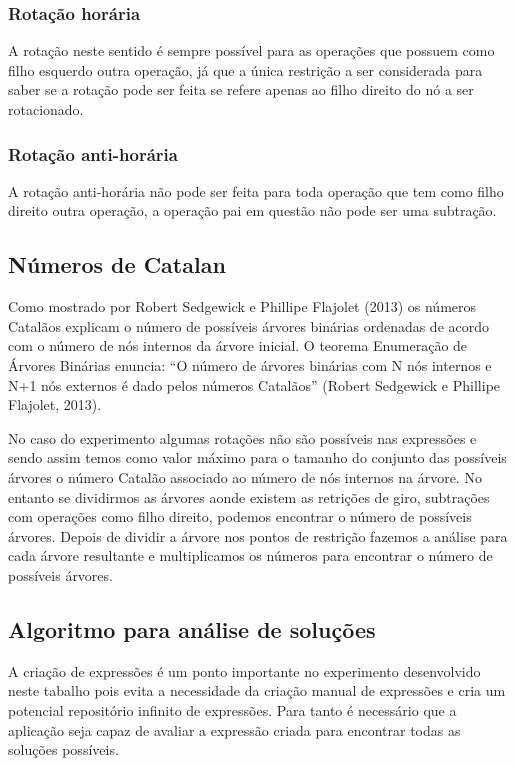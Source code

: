 \subsubsection{Rotação horária}
	A rotação neste sentido é sempre possível para as operações que possuem como filho esquerdo outra operação, já que a única restrição a ser considerada para saber se a rotação pode ser feita se refere apenas ao filho direito do nó a ser rotacionado.
	
\subsubsection{Rotação anti-horária}
	A rotação anti-horária não pode ser feita para toda operação que tem como filho direito outra operação, a operação pai em questão não pode ser uma subtração.
	
\subsection{Números de Catalan}
Como mostrado por Robert Sedgewick e Phillipe Flajolet (2013) os números Catalãos explicam o número de possíveis árvores binárias ordenadas de acordo com o número de nós internos da árvore inicial. O teorema Enumeração de Árvores Binárias enuncia: “O número de árvores binárias com N nós internos e N+1 nós externos é dado pelos números Catalãos” (Robert Sedgewick e Phillipe Flajolet, 2013).

	No caso do experimento algumas rotações não são possíveis nas expressões e sendo assim temos como valor máximo para o tamanho do conjunto das possíveis árvores o número Catalão associado ao número de nós internos na árvore. No entanto se dividirmos as árvores aonde existem as retrições de giro, subtrações com operações como filho direito, podemos encontrar o número de possíveis árvores. Depois de dividir a árvore nos pontos de restrição fazemos a análise para cada árvore resultante e multiplicamos os números para encontrar o número de possíveis árvores.
	
\subsection{Algoritmo para análise de soluções}
A criação de expressões é um ponto importante no experimento desenvolvido neste tabalho pois evita a necessidade da criação manual de expressões e cria um potencial repositório infinito de expressões. Para tanto é necessário que a aplicação seja capaz de avaliar a expressão criada para encontrar todas as soluções possíveis.

